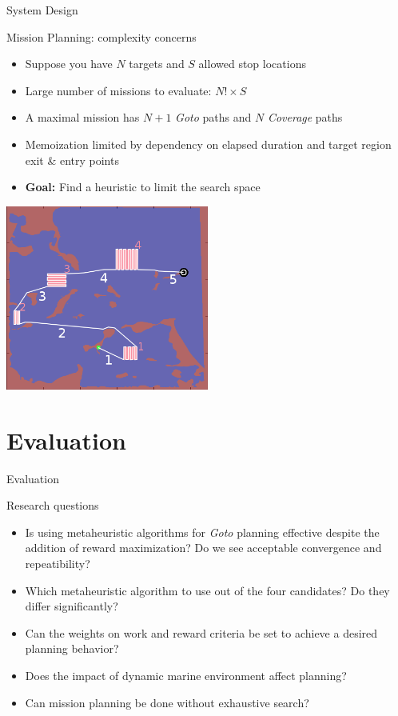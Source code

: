 \documentclass[9pt]{beamer}
\begin{document}
\begin{frame}{System Design}
    \begin{block}{Mission Planning: complexity concerns}
	    \begin{itemize}
	        \item Suppose you have $N$ targets and $S$ allowed stop locations
	        \item Large number of missions to evaluate: $N! \times S$
	        \item A maximal mission has $N + 1$ \textit{Goto} paths and $N$ \textit{Coverage} paths
	        \item Memoization limited by dependency on elapsed duration and target region exit \& entry points
	        \item \textbf{Goal:} Find a heuristic to limit the search space
        \end{itemize}
    \end{block}
    \begin{center}
        \includegraphics[width=0.5\textwidth,trim={0cm 1cm 0cm 1.75cm},clip]{img/nummissions.png}
    \end{center}
\end{frame}

\section{Evaluation}
\begin{frame}{Evaluation}
    \begin{block}{Research questions}
	    \begin{itemize}
	        \item Is using metaheuristic algorithms for \textit{Goto} planning effective despite the addition of reward maximization? Do we see acceptable convergence and repeatibility?
	        \item Which metaheuristic algorithm to use out of the four candidates? Do they differ significantly?
	        \item Can the weights on work and reward criteria be set to achieve a desired planning behavior?
	        \item Does the impact of dynamic marine environment affect planning?
	        \item Can mission planning be done without exhaustive search?
        \end{itemize}
    \end{block}
\end{frame}
\end{document}
